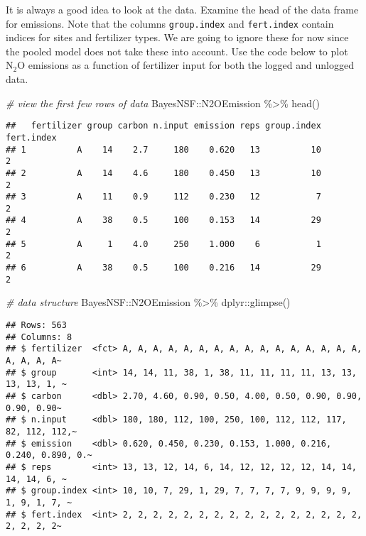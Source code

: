 \documentclass[
]{article}
\newenvironment{Shaded}{\begin{snugshade}}{\end{snugshade}}
\newcommand{\CommentTok}[1]{\textcolor[rgb]{0.56,0.35,0.01}{\textit{#1}}}
\newcommand{\FunctionTok}[1]{\textcolor[rgb]{0.00,0.00,0.00}{#1}}
\newcommand{\NormalTok}[1]{#1}
\newcommand{\SpecialCharTok}[1]{\textcolor[rgb]{0.00,0.00,0.00}{#1}}
\begin{document}
It is always a good idea to look at the data. Examine the head of the
data frame for emissions. Note that the columns \texttt{group.index} and
\texttt{fert.index} contain indices for sites and fertilizer types. We
are going to ignore these for now since the pooled model does not take
these into account. Use the code below to plot
\(\textrm{N} _2 \textrm{O}\) emissions as a function of fertilizer input
for both the logged and unlogged data.

\begin{Shaded}
\begin{Highlighting}[]
\CommentTok{\# view the first few rows of data}
\NormalTok{BayesNSF}\SpecialCharTok{::}\NormalTok{N2OEmission }\SpecialCharTok{\%\textgreater{}\%} 
  \FunctionTok{head}\NormalTok{()}
\end{Highlighting}
\end{Shaded}

\begin{verbatim}
##   fertilizer group carbon n.input emission reps group.index fert.index
## 1          A    14    2.7     180    0.620   13          10          2
## 2          A    14    4.6     180    0.450   13          10          2
## 3          A    11    0.9     112    0.230   12           7          2
## 4          A    38    0.5     100    0.153   14          29          2
## 5          A     1    4.0     250    1.000    6           1          2
## 6          A    38    0.5     100    0.216   14          29          2
\end{verbatim}

\begin{Shaded}
\begin{Highlighting}[]
\CommentTok{\# data structure}
\NormalTok{BayesNSF}\SpecialCharTok{::}\NormalTok{N2OEmission }\SpecialCharTok{\%\textgreater{}\%} 
\NormalTok{  dplyr}\SpecialCharTok{::}\FunctionTok{glimpse}\NormalTok{()}
\end{Highlighting}
\end{Shaded}

\begin{verbatim}
## Rows: 563
## Columns: 8
## $ fertilizer  <fct> A, A, A, A, A, A, A, A, A, A, A, A, A, A, A, A, A, A, A, A~
## $ group       <int> 14, 14, 11, 38, 1, 38, 11, 11, 11, 11, 13, 13, 13, 13, 1, ~
## $ carbon      <dbl> 2.70, 4.60, 0.90, 0.50, 4.00, 0.50, 0.90, 0.90, 0.90, 0.90~
## $ n.input     <dbl> 180, 180, 112, 100, 250, 100, 112, 112, 117, 82, 112, 112,~
## $ emission    <dbl> 0.620, 0.450, 0.230, 0.153, 1.000, 0.216, 0.240, 0.890, 0.~
## $ reps        <int> 13, 13, 12, 14, 6, 14, 12, 12, 12, 12, 14, 14, 14, 14, 6, ~
## $ group.index <int> 10, 10, 7, 29, 1, 29, 7, 7, 7, 7, 9, 9, 9, 9, 1, 9, 1, 7, ~
## $ fert.index  <int> 2, 2, 2, 2, 2, 2, 2, 2, 2, 2, 2, 2, 2, 2, 2, 2, 2, 2, 2, 2~
\end{verbatim}
\end{document}
